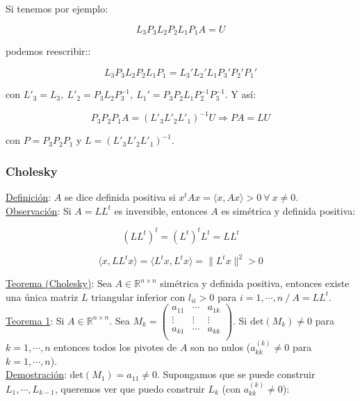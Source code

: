 Si tenemos por ejemplo:

$$L_{3}P_{3}L_{2}P_{2}L_{1}P_{1}A = U$$

podemos reescribir::

$$L_{3}P_{3}L_{2}P_{2}L_{1}P_{1} = L_{3}'L_{2}'L_{1}P_{3}'P_{2}'P_{1}'$$

con $L'_{3} = L_{3},\ L'_{2} = P_{3}L_{2}P_{3}^{-1},\ L_{1}' = P_{3}P_{2}L_{1}P_{2}^{-1}P_{3}^{-1}$. Y as\'i:

$$P_{3}P_{2}P_{1}A = (L'_{3}L'_{2}L'_{1})^{-1}U \Rightarrow PA = LU$$

con $P = P_{3}P_{2}P_{1}$ y $ L = (L'_{3}L'_{2}L'_{1})^{-1}$.

\subsubsection{Cholesky}

\underline{Definici\'on}: $A$ se dice definida positiva si $x^{t}Ax = \langle x, Ax \rangle > 0\ \forall \ x \neq 0$.\\

\underline{Observaci\'on}: Si $A = LL^{t}$ es inversible, entonces $A$ es sim\'etrica y definida positiva:

$$(LL^{t})^{t} = (L^{t})^{t}L^{t} = LL^{t}$$

$$\langle x, LL^{t}x \rangle = \langle L^{t}x, L^{t}x \rangle = \|L^{t}x\|^{2} > 0$$

\underline{Teorema (Cholesky)}: Sea $A \in \mathbb{R}^{n \times n}$ sim\'etrica y definida positiva, entonces existe una \'unica matriz $L$ triangular inferior con $l_{ii} > 0$ para $i = 1, \cdots, n\ / \ A = LL^{t}$.\\

\underline{Teorema 1}: Si $A \in \mathbb{R}^{n \times n}$. Sea $ M_{k} =
	\begin{pmatrix}
        a_{11} & \cdots & a_{1k}\\
        \vdots & \vdots & \vdots\\
        a_{k1} & \cdots & a_{kk}\\
	\end{pmatrix}
$. Si $\text{det}(M_{k}) \neq 0$ para $k = 1, \cdots, n$ entonces todos los pivotes de $A$ son no nulos ($a_{kk}^{(k)} \neq 0$ para $k = 1, \cdots, n$).\\

\underline{Demostraci\'on}: $\text{det}(M_{1}) = a_{11} \neq 0$. Supongamos que se puede construir $L_{1}, \cdots, L_{k - 1}$, queremos ver que puedo construir $L_{k}$ (con $a_{kk}^{(k)} \neq 0$):

